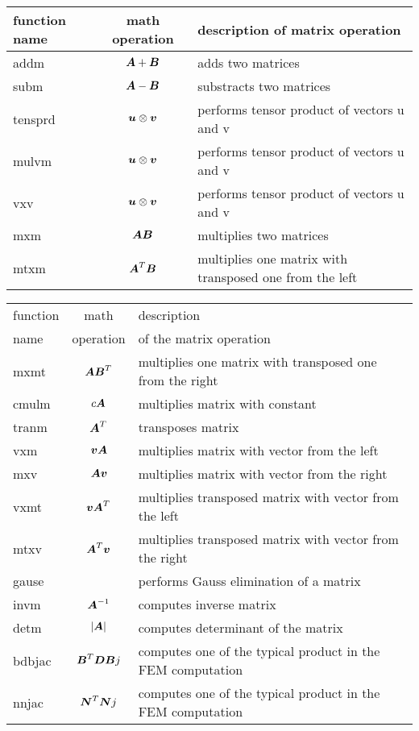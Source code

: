 \begin{center}
\begin{tabular}{|l|c|l|}
\hline
function name  & math operation & description of matrix operation
\\ \hline \hline
{\sf addm} & ${\mbox{\boldmath$A$} + \mbox{\boldmath$B$}}$ & adds two matrices
\\ \hline
{\sf subm} & ${\mbox{\boldmath$A$} - \mbox{\boldmath$B$}}$ & substracts two matrices
\\ \hline
{\sf tensprd} & ${\mbox{\boldmath$u$} \otimes \mbox{\boldmath$v$}}$ & performs tensor product of vectors u and v
\\ \hline
{\sf mulvm} & ${\mbox{\boldmath$u$} \otimes \mbox{\boldmath$v$}}$ & performs tensor product of vectors u and v
\\ \hline
{\sf vxv} & ${\mbox{\boldmath$u$} \otimes \mbox{\boldmath$v$}}$ & performs tensor product of vectors u and v
\\ \hline
{\sf mxm} & ${\mbox{\boldmath$A$} \mbox{\boldmath$B$}}$ & multiplies two matrices
\\ \hline
{\sf mtxm} & ${\mbox{\boldmath$A$}^T \mbox{\boldmath$B$}}$ & multiplies one matrix with transposed one from the left
\\ \hline
\end{tabular}
\end{center}
\begin{center}
\begin{tabular}{|l|c|l|}
\hline
function & math & description \\
name     & operation & of the matrix operation
\\ \hline \hline
{\sf mxmt} & ${\mbox{\boldmath$A$} \mbox{\boldmath$B$}^T}$ & multiplies one matrix with transposed one from the right
\\ \hline
{\sf cmulm} & $c{\mbox{\boldmath$A$}}$ & multiplies matrix with constant
\\ \hline
{\sf tranm} & ${\mbox{\boldmath$A$}^T}$ & transposes matrix
\\ \hline
{\sf vxm} & ${\mbox{\boldmath$v$} \mbox{\boldmath$A$}}$ & multiplies matrix with vector from the left
\\ \hline
{\sf mxv} & ${\mbox{\boldmath$A$} \mbox{\boldmath$v$}}$ & multiplies matrix with vector from the right
\\ \hline
{\sf vxmt} & ${\mbox{\boldmath$v$} \mbox{\boldmath$A$}^T}$ & multiplies transposed matrix with vector from the left
\\ \hline
{\sf mtxv} & ${\mbox{\boldmath$A$}^T \mbox{\boldmath$v$}}$ & multiplies transposed matrix with vector from the right
\\ \hline
{\sf gause} &  & performs Gauss elimination of a matrix
\\ \hline
{\sf invm} & ${\mbox{\boldmath$A$}^{-1}}$ & computes inverse matrix
\\ \hline
{\sf detm} & $|{\mbox{\boldmath$A$}}|$ & computes determinant of the matrix
\\ \hline
{\sf bdbjac} & $\mbox{\boldmath$B$}^T \mbox{\boldmath$D B$}j$ & computes one of the typical product in the FEM computation
\\ \hline
{\sf nnjac} & $\mbox{\boldmath$N$}^T \mbox{\boldmath$N$} j$ & computes one of the typical product in the FEM computation
\\ \hline
\end{tabular}
\end{center}

